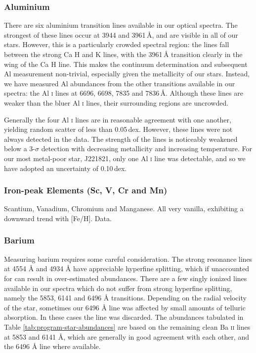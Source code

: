 \documentclass{emulateapj}
\begin{document}
\subsubsection{Aluminium}
There are six aluminium transition lines available in our optical spectra. The strongest of these lines occur at 3944 and 3961\,{\AA}, and are visible in all of our stars. However, this is a particularly crowded spectral region: the lines fall between the strong Ca H and K lines, with the 3961\,{\AA} transition clearly in the wing of the Ca H line. This makes the continuum determination and subsequent Al measurement non-trivial, especially given the metallicity of our stars. Instead, we have measured Al abundances from the other transitions available in our spectra: the Al \textsc{i} lines at 6696, 6698, 7835 and 7836\,{\AA}. Although these lines are weaker than the bluer Al \textsc{i} lines, their surrounding regions are uncrowded.

Generally the four Al \textsc{i} lines are in reasonable agreement with one another, yielding random scatter of less than 0.05\,dex. However, these lines were not always detected in the data. The strength of the lines is noticeably weakened below a 3-$\sigma$ detection with decreasing metallicity and increasing temperature. For our most metal-poor star, J221821, only one Al \textsc{i} line was detectable, and so we have adopted an uncertainty of 0.10\,dex. 


\subsubsection{Iron-peak Elements (Sc, V, Cr and Mn)}
Scantium, Vanadium, Chromium and Manganese. All very vanilla, exhibiting a downward trend with [Fe/H].
Data.


\subsubsection{Barium}

Measuring barium requires some careful consideration. The strong resonance lines at 4554 {\AA} and 4934 {\AA} have appreciable hyperfine splitting, which if unaccounted for can result in over-estimated abundances. There are a few singly ionized lines available in our spectra which do not suffer from strong hyperfine splitting, namely the 5853, 6141 and 6496 {\AA} transitions. Depending on the radial velocity of the star, sometimes our 6496 {\AA} line was affected by small amounts of telluric absorption. In these cases the line was discarded. The abundances tabulated in Table \ref{tab:program-star-abundances} are based on the remaining clean Ba \textsc{ii} lines at 5853 and 6141 {\AA}, which are generally in good agreement with each other, and the 6496 {\AA} line where available.
\end{document}
